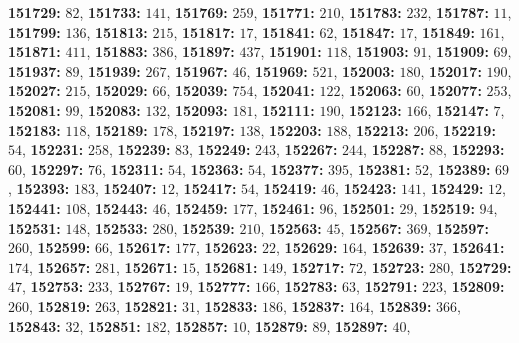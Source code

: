 \textsf{\bfseries 151729:} $82$, \textsf{\bfseries 151733:} $141$, \textsf{\bfseries 151769:} $259$, \textsf{\bfseries 151771:} $210$, \textsf{\bfseries 151783:} $232$, \textsf{\bfseries 151787:} $11$, \textsf{\bfseries 151799:} $136$, \textsf{\bfseries 151813:} $215$, \textsf{\bfseries 151817:} $17$, \textsf{\bfseries 151841:} $62$, \textsf{\bfseries 151847:} $17$, \textsf{\bfseries 151849:} $161$, \textsf{\bfseries 151871:} $411$, \textsf{\bfseries 151883:} $386$, \textsf{\bfseries 151897:} $437$, \textsf{\bfseries 151901:} $118$, \textsf{\bfseries 151903:} $91$, \textsf{\bfseries 151909:} $69$, \textsf{\bfseries 151937:} $89$, \textsf{\bfseries 151939:} $267$, \textsf{\bfseries 151967:} $46$, \textsf{\bfseries 151969:} $521$, \textsf{\bfseries 152003:} $180$, \textsf{\bfseries 152017:} $190$, \textsf{\bfseries 152027:} $215$, \textsf{\bfseries 152029:} $66$, \textsf{\bfseries 152039:} $754$, \textsf{\bfseries 152041:} $122$, \textsf{\bfseries 152063:} $60$, \textsf{\bfseries 152077:} $253$, \textsf{\bfseries 152081:} $99$, \textsf{\bfseries 152083:} $132$, \textsf{\bfseries 152093:} $181$, \textsf{\bfseries 152111:} $190$, \textsf{\bfseries 152123:} $166$, \textsf{\bfseries 152147:} $7$, \textsf{\bfseries 152183:} $118$, \textsf{\bfseries 152189:} $178$, \textsf{\bfseries 152197:} $138$, \textsf{\bfseries 152203:} $188$, \textsf{\bfseries 152213:} $206$, \textsf{\bfseries 152219:} $54$, \textsf{\bfseries 152231:} $258$, \textsf{\bfseries 152239:} $83$, \textsf{\bfseries 152249:} $243$, \textsf{\bfseries 152267:} $244$, \textsf{\bfseries 152287:} $88$, \textsf{\bfseries 152293:} $60$, \textsf{\bfseries 152297:} $76$, \textsf{\bfseries 152311:} $54$, \textsf{\bfseries 152363:} $54$, \textsf{\bfseries 152377:} $395$, \textsf{\bfseries 152381:} $52$, \textsf{\bfseries 152389:} $69$, \textsf{\bfseries 152393:} $183$, \textsf{\bfseries 152407:} $12$, \textsf{\bfseries 152417:} $54$, \textsf{\bfseries 152419:} $46$, \textsf{\bfseries 152423:} $141$, \textsf{\bfseries 152429:} $12$, \textsf{\bfseries 152441:} $108$, \textsf{\bfseries 152443:} $46$, \textsf{\bfseries 152459:} $177$, \textsf{\bfseries 152461:} $96$, \textsf{\bfseries 152501:} $29$, \textsf{\bfseries 152519:} $94$, \textsf{\bfseries 152531:} $148$, \textsf{\bfseries 152533:} $280$, \textsf{\bfseries 152539:} $210$, \textsf{\bfseries 152563:} $45$, \textsf{\bfseries 152567:} $369$, \textsf{\bfseries 152597:} $260$, \textsf{\bfseries 152599:} $66$, \textsf{\bfseries 152617:} $177$, \textsf{\bfseries 152623:} $22$, \textsf{\bfseries 152629:} $164$, \textsf{\bfseries 152639:} $37$, \textsf{\bfseries 152641:} $174$, \textsf{\bfseries 152657:} $281$, \textsf{\bfseries 152671:} $15$, \textsf{\bfseries 152681:} $149$, \textsf{\bfseries 152717:} $72$, \textsf{\bfseries 152723:} $280$, \textsf{\bfseries 152729:} $47$, \textsf{\bfseries 152753:} $233$, \textsf{\bfseries 152767:} $19$, \textsf{\bfseries 152777:} $166$, \textsf{\bfseries 152783:} $63$, \textsf{\bfseries 152791:} $223$, \textsf{\bfseries 152809:} $260$, \textsf{\bfseries 152819:} $263$, \textsf{\bfseries 152821:} $31$, \textsf{\bfseries 152833:} $186$, \textsf{\bfseries 152837:} $164$, \textsf{\bfseries 152839:} $366$, \textsf{\bfseries 152843:} $32$, \textsf{\bfseries 152851:} $182$, \textsf{\bfseries 152857:} $10$, \textsf{\bfseries 152879:} $89$, \textsf{\bfseries 152897:} $40$, 
